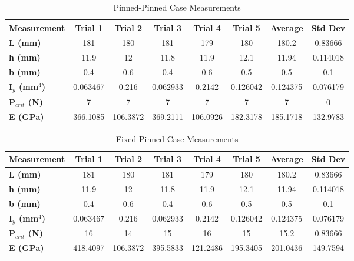 \documentclass[12pt]{article}
\begin{document}
\begin{table}[h!]
\centering
\caption{Pinned-Pinned Case Measurements}
\begin{tabular}{@{}lccccccc@{}}
\toprule
\textbf{Measurement} & \textbf{Trial 1} & \textbf{Trial 2} & \textbf{Trial 3} & \textbf{Trial 4} & \textbf{Trial 5} & \textbf{Average} & \textbf{Std Dev} \\ \midrule
\textbf{L (mm)} & 181 & 180 & 181 & 179 & 180 & 180.2 & 0.83666 \\
\textbf{h (mm)} & 11.9 & 12 & 11.8 & 11.9 & 12.1 & 11.94 & 0.114018 \\
\textbf{b (mm)} & 0.4 & 0.6 & 0.4 & 0.6 & 0.5 & 0.5 & 0.1 \\
\textbf{I\(_y\) (mm\(^4\))} & 0.063467 & 0.216 & 0.062933 & 0.2142 & 0.126042 & 0.124375 & 0.076179 \\
\textbf{P\(_{crit}\) (N)} & 7 & 7 & 7 & 7 & 7 & 7 & 0 \\
\textbf{E (GPa)} & 366.1085 & 106.3872 & 369.2111 & 106.0926 & 182.3178 & 185.1718 & 132.9783 \\
\bottomrule
\end{tabular}
\label{tab:pinned_pinned}
\end{table}

\begin{table}[h!]
\centering
\caption{Fixed-Pinned Case Measurements}
\begin{tabular}{@{}lccccccc@{}}
\toprule
\textbf{Measurement} & \textbf{Trial 1} & \textbf{Trial 2} & \textbf{Trial 3} & \textbf{Trial 4} & \textbf{Trial 5} & \textbf{Average} & \textbf{Std Dev} \\ \midrule
\textbf{L (mm)} & 181 & 180 & 181 & 179 & 180 & 180.2 & 0.83666 \\
\textbf{h (mm)} & 11.9 & 12 & 11.8 & 11.9 & 12.1 & 11.94 & 0.114018 \\
\textbf{b (mm)} & 0.4 & 0.6 & 0.4 & 0.6 & 0.5 & 0.5 & 0.1 \\
\textbf{I\(_y\) (mm\(^4\))} & 0.063467 & 0.216 & 0.062933 & 0.2142 & 0.126042 & 0.124375 & 0.076179 \\
\textbf{P\(_{crit}\) (N)} & 16 & 14 & 15 & 16 & 15 & 15.2 & 0.83666 \\
\textbf{E (GPa)} & 418.4097 & 106.3872 & 395.5833 & 121.2486 & 195.3405 & 201.0436 & 149.7594 \\
\bottomrule
\end{tabular}
\label{tab:fixed_pinned}
\end{table}
\end{document}
